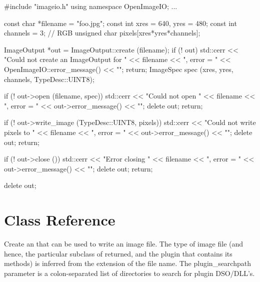 \begin{code}
        #include "imageio.h"
        using namespace OpenImageIO;
        ...

        const char *filename = "foo.jpg";
        const int xres = 640, yres = 480;
        const int channels = 3;  // RGB
        unsigned char pixels[xres*yres*channels];

        ImageOutput *out = ImageOutput::create (filename);
        if (! out) {
            std::cerr << "Could not create an ImageOutput for " 
                      << filename << ", error = " 
                      << OpenImageIO::error_message() << "\n";
            return;
        }
        ImageSpec spec (xres, yres, channels, TypeDesc::UINT8);

        if (! out->open (filename, spec)) {
            std::cerr << "Could not open " << filename 
                      << ", error = " << out->error_message() << "\n";
            delete out;
            return;
        }

        if (! out->write_image (TypeDesc::UINT8, pixels)) {
            std::cerr << "Could not write pixels to " << filename 
                      << ", error = " << out->error_message() << "\n";
            delete out;
            return;
        }

        if (! out->close ()) {
            std::cerr << "Error closing " << filename 
                      << ", error = " << out->error_message() << "\n";
            delete out;
            return;
        }

        delete out;
\end{code}



\section{\ImageOutput Class Reference}
\label{sec:imageoutput:reference}


Create an \ImageOutput that can be used to write an image file.  The
type of image file (and hence, the particular subclass of \ImageOutput
returned, and the plugin that contains its methods) is inferred from the
extension of the file name.  The {\kw plugin_searchpath} parameter is a
colon-separated list of directories to search for \product plugin
DSO/DLL's.

